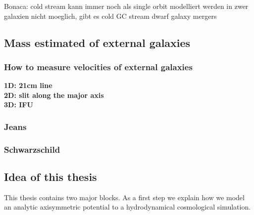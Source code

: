    
Bonaca: cold stream kann immer noch als single orbit modelliert werden 
in zwer galaxien nicht moeglich, gibt es cold GC stream dwarf galaxy mergers


\subsection{Mass estimated of external galaxies}\label{subsec:mass_est_ext}
\subsubsection{How to measure velocities of external galaxies}
\textbf{1D: 21cm line}\\
\textbf{2D: slit along the major axis}\\
\textbf{3D: \ac{IFU}}
\subsubsection{Jeans}
\subsubsection{Schwarzschild}

\subsection{Idea of this thesis}
This thesis contains two major blocks. As a first step we explain how we model an analytic axisymmetric potential to a hydrodynamical cosmological simulation. 